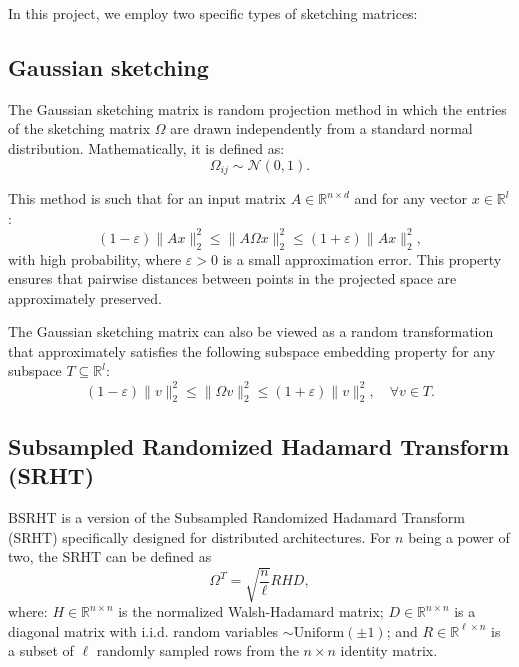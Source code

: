 \documentclass[a4paper, 12pt,oneside]{article}
\begin{document}
In this project, we employ two specific types of sketching matrices:
\subsection{Gaussian sketching }
The Gaussian sketching matrix is random projection method in which the entries of the sketching matrix $\Omega$ are drawn independently from a standard normal distribution. Mathematically, it is defined as:
\[
\Omega_{ij} \sim \mathcal{N}(0, 1).
\]

This method is such that for an input matrix $A \in \mathbb{R}^{n \times d}$ and for any vector $x \in \mathbb{R}^l$:
\[
(1 - \varepsilon)\|A x\|_2^2 \leq \|A \Omega x\|_2^2 \leq (1 + \varepsilon)\|A x\|_2^2,
\]
with high probability, where $\varepsilon > 0$ is a small approximation error. This property ensures that pairwise distances between points in the projected space are approximately preserved.

The Gaussian sketching matrix can also be viewed as a random transformation that approximately satisfies the following subspace embedding property for any subspace $T \subseteq \mathbb{R}^l$:
\[
(1 - \varepsilon) \|v\|_2^2 \leq \|\Omega v\|_2^2 \leq (1 + \varepsilon) \|v\|_2^2, \quad \forall v \in T.
\]

\subsection{Subsampled Randomized Hadamard Transform (SRHT)}
BSRHT is a version of the Subsampled Randomized Hadamard Transform (SRHT) specifically designed for distributed architectures. For $n$ being a power of two, the SRHT can be defined as
\[
\Omega^T = \sqrt{\frac{n}{\ell}} RHD,
\]
where: $H \in \mathbb{R}^{n \times n}$ is the normalized Walsh-Hadamard matrix; $D \in \mathbb{R}^{n \times n}$ is a diagonal matrix with i.i.d. random variables $\sim \text{Uniform}(\pm 1)$; and $R \in \mathbb{R}^{\ell \times n}$ is a subset of $\ell$ randomly sampled rows from the $n \times n$ identity matrix.
\end{document}
